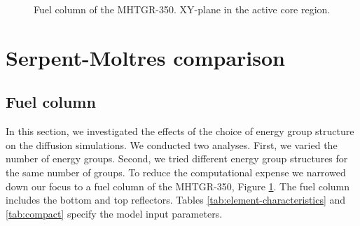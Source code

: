 \documentclass[11pt,letterpaper]{article}
\begin{document}
\begin{figure}[htbp!]
	\centering
	\hfill
    \caption{Fuel column of the MHTGR-350. XY-plane in the active core region.}
	\label{fig:fuelcolumn}
\end{figure}

\section{Serpent-Moltres comparison}

\subsection{Fuel column}

In this section, we investigated the effects of the choice of energy group structure on the diffusion simulations.
We conducted two analyses.
First, we varied the number of energy groups.
Second, we tried different energy group structures for the same number of groups.
To reduce the computational expense we narrowed down our focus to a fuel column of the MHTGR-350, Figure \ref{fig:fuelcolumn}.
The fuel column includes the bottom and top reflectors.
Tables \ref{tab:element-characteristics} and \ref{tab:compact} specify the model input parameters.
\end{document}
